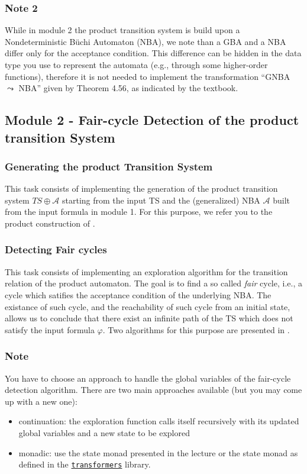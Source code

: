 \documentclass{article}
\begin{document}
\subsubsection*{Note 2}
While in module 2 the product transition system is build upon a Nondeterministic Büchi Automaton (NBA), we note 
than a GBA and a NBA differ only for the acceptance condition. This difference can be hidden in the 
data type you use to represent the automata (e.g., through some higher-order functions), 
therefore it is not needed to implement the transformation ``GNBA $\leadsto$ NBA'' given by Theorem 4.56, as indicated 
by the textbook.

\subsection{Module 2 - Fair-cycle Detection of the product transition System}
\label{subsec-m2}
\subsubsection*{Generating the product Transition System}
This task consists of implementing the generation of the product transition system $TS \oplus \mathcal{A}$
starting from the input TS and the (generalized) NBA $\mathcal{A}$ built from the input formula in module 1.
For this purpose, we refer you to the product construction of \cite[Section 4.4.1]{BaKa}.

\subsubsection*{Detecting Fair cycles}
This task consists of implementing an exploration algorithm for the transition relation of the product 
automaton. The goal is to find a so called \emph{fair} cycle, i.e., a cycle which satifies the acceptance 
condition of the underlying NBA. The existance of such cycle, and the reachability of such cycle from an 
initial state, allows us to conclude that there exist an infinite path of the TS which does not satisfy the input 
formula $\varphi$. Two algorithms for this purpose are presented in \cite[Section 4.4.2]{BaKa}.

\subsubsection*{Note}
You have to choose an approach to handle the global variables of the fair-cycle detection algorithm. 
There are two main approaches available (but you may come up with a new one):
\begin{itemize}
    \item continuation: the exploration function calls itself recursively with its updated global variables 
            and a new state to be explored 
    \item monadic: use the state monad presented in the lecture or the state monad 
            as defined in the \href{https://hackage.haskell.org/package/transformers}{\texttt{transformers}} library.
\end{itemize}
\end{document}
